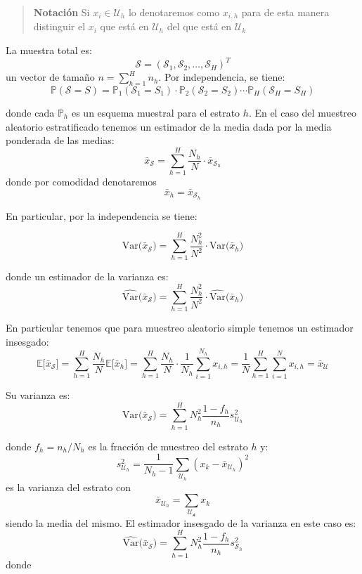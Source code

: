 \documentclass[
]{book}
\begin{document}
\begin{quote}
\textbf{Notación} Si \(x_i \in \mathcal{U}_h\) lo denotaremos como \(x_{i,h}\) para de esta manera distinguir el \(x_i\) que está en \(\mathcal{U}_h\) del que está en \(\mathcal{U}_k\)
\end{quote}

La muestra total es:
\[
\mathcal{S} = (\mathcal{S}_1, \mathcal{S}_2, \dots, \mathcal{S}_H)^T 
\]
un vector de tamaño \(n = \sum_{h = 1}^H n_h\). Por independencia, se tiene:
\[
\mathbb{P}(\mathcal{S} = S) = \mathbb{P}_1(\mathcal{S}_1 = S_1)\cdot\mathbb{P}_2(\mathcal{S}_2 = S_2) \cdots \mathbb{P}_H(\mathcal{S}_H = S_H)
\]

donde cada \(\mathbb{P}_h\) es un esquema muestral para el estrato \(h\). En el caso del muestreo aleatorio estratificado tenemos un estimador de la media dada por la media ponderada de las medias:
\[
\bar{x}_{\mathcal{S}} = \sum\limits_{h = 1}^{H} \dfrac{N_h}{N}\cdot\bar{x}_{\mathcal{S}_h}
\]
donde por comodidad denotaremos
\[
\bar{x}_h = \bar{x}_{\mathcal{S}_h}
\]

En particular, por la independencia se tiene:

\[
\textrm{Var}\big(\bar{x}_{\mathcal{S}}\big) = \sum\limits_{h = 1}^{H} \dfrac{N_h^2}{N^2}\cdot\textrm{Var}\big(\bar{x}_{h}\big)
\]

donde un estimador de la varianza es:
\[
\widehat{\textrm{Var}}\big(\bar{x}_{\mathcal{S}}\big) = \sum\limits_{h = 1}^{H} \dfrac{N_h^2}{N^2}\cdot\widehat{\textrm{Var}}\big(\bar{x}_{h}\big)
\]

En particular tenemos que para muestreo aleatorio simple tenemos un estimador insesgado:
\[
\mathbb{E}\Big[\bar{x}_{\mathcal{S}} \Big] = \sum\limits_{h = 1}^{H} \dfrac{N_h}{N} \mathbb{E}\big[\bar{x}_h\big]= \sum\limits_{h = 1}^{H} \dfrac{N_h}{N}\cdot \dfrac{1}{N_h}\sum\limits_{i = 1}^{N_h}x_{i,h} =\frac{1}{N} \sum\limits_{h = 1}^{H}\sum\limits_{i = 1}^N  x_{i,h} = \bar{x}_{\mathcal{U}}
\]

Su varianza es:
\[
\textrm{Var}\big(\bar{x}_{\mathcal{S}}\big) = \sum\limits_{h = 1}^H N_h^2\dfrac{1 - f_h}{n_h} s^2_{\mathcal{U}_h}
\]

donde \(f_h = n_h/N_h\) es la fracción de muestreo del estrato \(h\) y:
\[
s^2_{\mathcal{U}_h} = \dfrac{1}{N_h - 1}\sum\limits_{\mathcal{U}_h}(x_k - \bar{x}_{\mathcal{U}_h})^2
\]
es la varianza del estrato con
\[
\bar{x}_{\mathcal{U}_h} = \sum_{\mathcal{U_h}} x_k
\]
siendo la media del mismo. El estimador insesgado de la varianza en este caso es:
\[
\widehat{\textrm{Var}}\big(\bar{x}_{\mathcal{S}}\big) = \sum\limits_{h = 1}^H N_h^2\dfrac{1 - f_h}{n_h} s^2_{\mathcal{S}_h}
\]
donde
\end{document}
